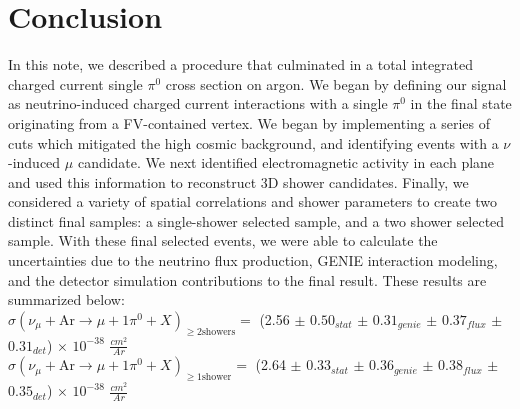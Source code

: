 \documentclass{article}
\begin{document}

\clearpage 
 \section{Conclusion}
In this note, we described a procedure that culminated in a total integrated charged current single $\pi^0$ cross section on argon. We began by defining our signal as neutrino-induced charged current interactions with a single $\pi^0$ in the final state originating from a FV-contained vertex.  We began by implementing a series of cuts which mitigated the high cosmic background, and identifying events with a $\nu$-induced $\mu$ candidate.  We next identified electromagnetic activity in each plane and used this information to reconstruct 3D shower candidates. Finally, we considered a variety of spatial correlations and shower parameters to create two distinct final samples: a single-shower selected sample, and a two shower selected sample.  With these final selected events, we were able to calculate the uncertainties due to the neutrino flux production, GENIE interaction modeling, and the detector simulation contributions to the final result.  These results are summarized below:\\

$\sigma\left(\nu_{\mu} + \text{Ar} \rightarrow \mu + 1 \pi^{0} + X\right)_{\geq 2 \text{showers}}=$ (2.56 $\pm$ $0.50_{stat}$ $\pm$ $0.31_{genie}$ $\pm$ $0.37_{flux}$ $\pm$ $0.31_{det}$) $\times$ $10^{-38}$ $\frac{cm^2}{Ar}$ \\

$\sigma\left(\nu_{\mu} + \text{Ar} \rightarrow \mu + 1 \pi^{0} + X\right)_{\geq 1 \text{shower}}=$ (2.64 $\pm$ $0.33_{stat}$ $\pm$ $0.36_{genie}$ $\pm$ $0.38_{flux}$ $\pm$ $0.35_{det}$) $\times$ $10^{-38}$ $\frac{cm^2}{Ar}$ \\
\end{document}
